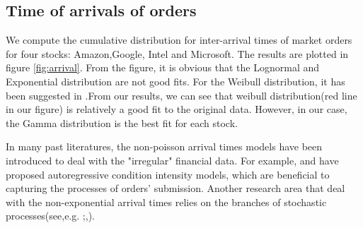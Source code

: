\subsection{Time of arrivals of orders}
We compute the cumulative distribution for inter-arrival times of market orders for four stocks: Amazon,Google, Intel and Microsoft. The results are plotted in figure \ref{fig:arrival}.
From the figure, it is obvious that the Lognormal and Exponential distribution are not good fits. For the Weibull distribution, it has been suggested in \cite{ivanov2004common}.From our results, we can see that weibull distribution(red line in our figure) is relatively a good fit to the original data. However, in our case, the Gamma distribution is the best fit for each stock. 

In many past literatures, the non-poisson arrival times models have been introduced to deal with the "irregular" financial data. For example,\cite{engle1997forecasting} and \cite{engle2000econometrics} have proposed autoregressive condition intensity models, which are beneficial to capturing the processes of orders' submission. Another research area that deal with the non-exponential arrival times relies on the branches of stochastic processes(see,e.g. \cite{clark1973subordinated};\cite{silva2007stochastic},\cite{huth2012times}). 


